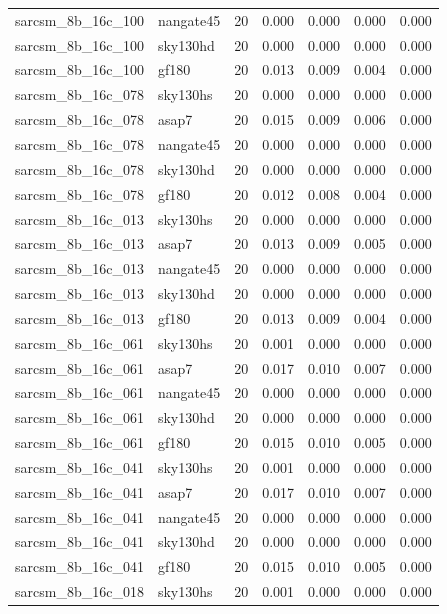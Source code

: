 \begin{tabular}{llrrrrr}
sarcsm\_8b\_16c\_100 & nangate45 & 20 & 0.000 & 0.000 & 0.000 & 0.000 \\
sarcsm\_8b\_16c\_100 & sky130hd & 20 & 0.000 & 0.000 & 0.000 & 0.000 \\
sarcsm\_8b\_16c\_100 & gf180 & 20 & 0.013 & 0.009 & 0.004 & 0.000 \\
sarcsm\_8b\_16c\_078 & sky130hs & 20 & 0.000 & 0.000 & 0.000 & 0.000 \\
sarcsm\_8b\_16c\_078 & asap7 & 20 & 0.015 & 0.009 & 0.006 & 0.000 \\
sarcsm\_8b\_16c\_078 & nangate45 & 20 & 0.000 & 0.000 & 0.000 & 0.000 \\
sarcsm\_8b\_16c\_078 & sky130hd & 20 & 0.000 & 0.000 & 0.000 & 0.000 \\
sarcsm\_8b\_16c\_078 & gf180 & 20 & 0.012 & 0.008 & 0.004 & 0.000 \\
sarcsm\_8b\_16c\_013 & sky130hs & 20 & 0.000 & 0.000 & 0.000 & 0.000 \\
sarcsm\_8b\_16c\_013 & asap7 & 20 & 0.013 & 0.009 & 0.005 & 0.000 \\
sarcsm\_8b\_16c\_013 & nangate45 & 20 & 0.000 & 0.000 & 0.000 & 0.000 \\
sarcsm\_8b\_16c\_013 & sky130hd & 20 & 0.000 & 0.000 & 0.000 & 0.000 \\
sarcsm\_8b\_16c\_013 & gf180 & 20 & 0.013 & 0.009 & 0.004 & 0.000 \\
sarcsm\_8b\_16c\_061 & sky130hs & 20 & 0.001 & 0.000 & 0.000 & 0.000 \\
sarcsm\_8b\_16c\_061 & asap7 & 20 & 0.017 & 0.010 & 0.007 & 0.000 \\
sarcsm\_8b\_16c\_061 & nangate45 & 20 & 0.000 & 0.000 & 0.000 & 0.000 \\
sarcsm\_8b\_16c\_061 & sky130hd & 20 & 0.000 & 0.000 & 0.000 & 0.000 \\
sarcsm\_8b\_16c\_061 & gf180 & 20 & 0.015 & 0.010 & 0.005 & 0.000 \\
sarcsm\_8b\_16c\_041 & sky130hs & 20 & 0.001 & 0.000 & 0.000 & 0.000 \\
sarcsm\_8b\_16c\_041 & asap7 & 20 & 0.017 & 0.010 & 0.007 & 0.000 \\
sarcsm\_8b\_16c\_041 & nangate45 & 20 & 0.000 & 0.000 & 0.000 & 0.000 \\
sarcsm\_8b\_16c\_041 & sky130hd & 20 & 0.000 & 0.000 & 0.000 & 0.000 \\
sarcsm\_8b\_16c\_041 & gf180 & 20 & 0.015 & 0.010 & 0.005 & 0.000 \\
sarcsm\_8b\_16c\_018 & sky130hs & 20 & 0.001 & 0.000 & 0.000 & 0.000 \\

\end{tabular}
